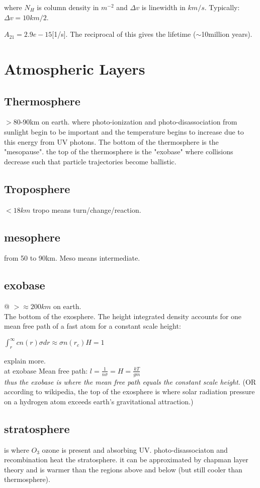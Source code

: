 where $N_H$ is column density in $m^{-2}$ and $\Delta v$ is linewidth in $km/s$. Typically: $\Delta v=10km/2$. 

\(A_{21}=2.9e-15\)[1/s]. The reciprocal of this gives the lifetime ($\sim$10million years).


\section{Atmospheric Layers}
\subsection{Thermosphere}
$>$80-90km on earth. where photo-ionization and photo-disassociation from sunlight begin to be important and the temperature begins to increase due to this energy from UV photons. The bottom of the thermosphere is the "mesopause". the top of the thermosphere is the "exobase" where collisions decrease such that  particle trajectories become ballistic.\\ 
\subsection{Troposphere}
$<18km$ tropo means turn/change/reaction.\\
\subsection{mesophere}
from 50 to 90km. Meso means intermediate.
\subsection{exobase}
@ $>\approx 200km$ on earth.\\
The bottom of the exosphere. 
The height integrated density accounts for one mean free path of a fast atom for a constant scale height:

\(\int^{\infty}_{r} c n(r) \sigma dr \approx \sigma n(r_c)H =1\) 

explain more.\\
at exobase Mean free path: $\boxed{l=\frac{1}{n\sigma}=H=\frac{kT}{gm}}$\\
 \emph{thus the exobase is where the mean free path equals the constant scale height.}
(OR according to wikipedia, the top of the exosphere is where solar radiation pressure  on a hydrogen atom exceeds earth's gravitational attraction.)\\
\subsection{stratosphere} is where $O_3$ ozone is present and absorbing UV. photo-disassociaton and recombination heat the stratosphere. it can be approximated by chapman layer theory and is warmer than the regions above and below (but still cooler than thermosphere). %

